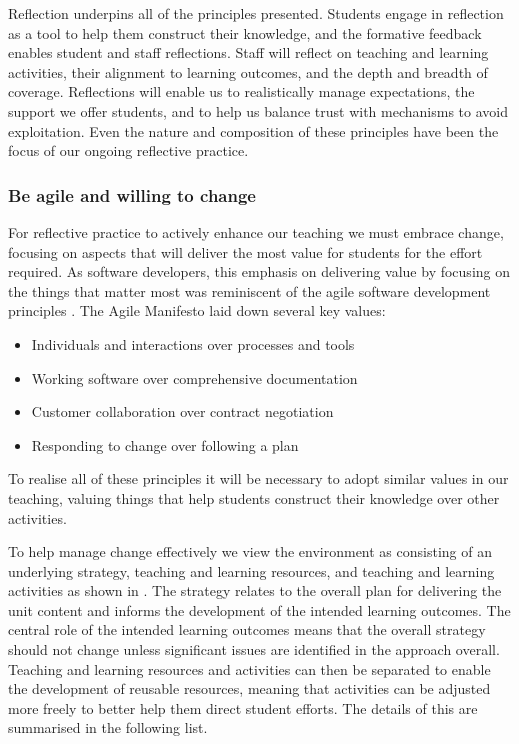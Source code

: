 Reflection underpins all of the principles presented. Students engage in reflection as a tool to help them construct their knowledge, and the formative feedback enables student and staff reflections. Staff will reflect on teaching and learning activities, their alignment to learning outcomes, and the depth and breadth of coverage. Reflections will enable us to realistically manage expectations, the support we offer students, and to help us balance trust with mechanisms to avoid exploitation. Even the nature and composition of these principles have been the focus of our ongoing reflective practice.



\subsubsection{Be agile and willing to change} %
\label{ssub:be_agile_and_willing_to_change}

For reflective practice to actively enhance our teaching we must embrace change, focusing on aspects that will deliver the most value for students for the effort required. As software developers, this emphasis on delivering value by focusing on the things that matter most was reminiscent of the agile software development principles \cite{Martin:2003}. The Agile Manifesto \cite{Beck:2001} laid down several key values: 

\begin{itemize}
	\item Individuals and interactions over processes and tools
	\item Working software over comprehensive documentation
	\item Customer collaboration over contract negotiation
	\item Responding to change over following a plan
\end{itemize}

\noindent To realise all of these principles it will be necessary to adopt similar values in our teaching, valuing things that help students construct their knowledge over other activities.

To help manage change effectively we view the environment as consisting of an underlying strategy, teaching and learning resources, and teaching and learning activities as shown in . The strategy relates to the overall plan for delivering the unit content and informs the development of the intended learning outcomes. The central role of the intended learning outcomes means that the overall strategy should not change unless significant issues are identified in the approach overall. Teaching and learning resources and activities can then be separated to enable the development of reusable resources, meaning that activities can be adjusted more freely to better help them direct student efforts. The details of this are summarised in the following list.

